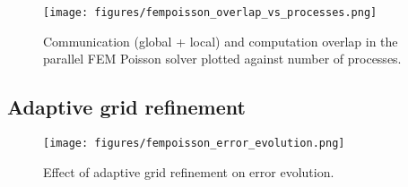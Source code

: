 \begin{figure}[H]
    \centering
    \texttt{[image: figures/fempoisson\_overlap\_vs\_processes.png]}
    \caption{
        Communication (global + local) and computation overlap in the parallel FEM Poisson solver plotted against
        number of processes.}
    \label{fig:parallel_fem_overlap_processors}
\end{figure}

\subsection{Adaptive grid refinement}
\begin{figure}[H]
    \centering
    \texttt{[image: figures/fempoisson\_error\_evolution.png]}
    \caption{Effect of adaptive grid refinement on error evolution.}
    \label{fig:parallel_fem_adaptive_refinement}
\end{figure}